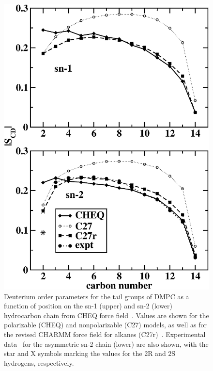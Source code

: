 \documentclass[journal=jpcbfk,manuscript=article,layout=twocolumn]{achemso}
\begin{document}
\begin{figure}[!hbt]
  \centering
  \includegraphics[width=\columnwidth]{../Figures/dmpc_order_charmmfq.png}
  \caption{Deuterium order parameters for the tail groups of DMPC as a function of position on the sn-1 (upper) and sn-2 (lower) hydrocarbon chain from CHEQ force field~\cite{davis2009molecular}. Values are shown for the polarizable (CHEQ) and nonpolarizable (C27) models, as well as for the revised CHARMM force field for alkanes (C27r)~\cite{klauda2005ab}. Experimental data~\cite{douliez1995restatement} for the asymmetric sn-2 chain (lower) are also shown, with the star and X symbols marking the values for the 2R and 2S hydrogens, respectively.}
  \label{fig:dmpccheq}
\end{figure}
\end{document}
